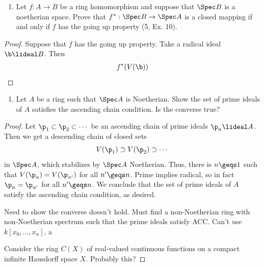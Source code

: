 \documentclass[12pt]{amsart}
\begin{document}
\begin{enumerate}
	\item[6.11.] {
      Let $f:A\to B$ be a ring homomorphism and suppose that $\Spec B$ is a noetherian space.
      Prove that $f^*:\Spec B\to \Spec A$ is a closed mapping if and only if $f$ has the going up property (5, Ex. 10).
    }
\end{enumerate}

\begin{proof}
  Suppose that $f$ has the going up property.
  Take a radical ideal $\b\lideal B$.
  Then
  \begin{align*}
    f^*(V(\b))
  \end{align*}
\end{proof}

\begin{enumerate}
  \item[6.12] {
      Let $A$ be a ring such that $\Spec A$ is Noetherian.
      Show the set of prime ideals of $A$ satisfies the ascending chain condition.
      Is the converse true?
    }
\end{enumerate}

\begin{proof}
  Let $\p_1\subset \p_2\subset\cdots$ be an ascending chain of prime ideals $\p_n\lideal A$.
  Then we get a descending chain of closed sets
  \[
    V(\p_1)\supset V(\p_2)\supset\cdots
  \] 
  in $\Spec A$, which stabilizes by $\Spec A$ Noetherian.
  Thus, there is $n\geqs 1$ such that $V(\p_n)=V(\p_{n'})$ for all $n'\geqs n$.
  Prime implies radical, so in fact $\p_n=\p_{n'}$ for all $n'\geqs n$.
  We conclude that the set of prime ideals of $A$ satisfy the ascending chain condition, as desired.

  Need to show the converse doesn't hold.
  Must find a non-Noetherian ring with non-Noetherian spectrum such that the prime ideals satisfy ACC.
  Can't use $k[x_0,\ldots, x_n]$, a

  Consider the ring $C(X)$ of real-valued continuous functions on a compact infinite Hausdorff space $X$.
  Probably this?
\end{proof}
\end{document}
